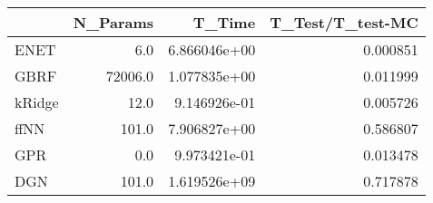 \begin{tabular}{lrrr}
\toprule
{} &  N\_Params &        T\_Time &  T\_Test/T\_test-MC \\
\midrule
ENET   &       6.0 &  6.866046e+00 &          0.000851 \\
GBRF   &   72006.0 &  1.077835e+00 &          0.011999 \\
kRidge &      12.0 &  9.146926e-01 &          0.005726 \\
ffNN   &     101.0 &  7.906827e+00 &          0.586807 \\
GPR    &       0.0 &  9.973421e-01 &          0.013478 \\
DGN    &     101.0 &  1.619526e+09 &          0.717878 \\
\bottomrule
\end{tabular}
